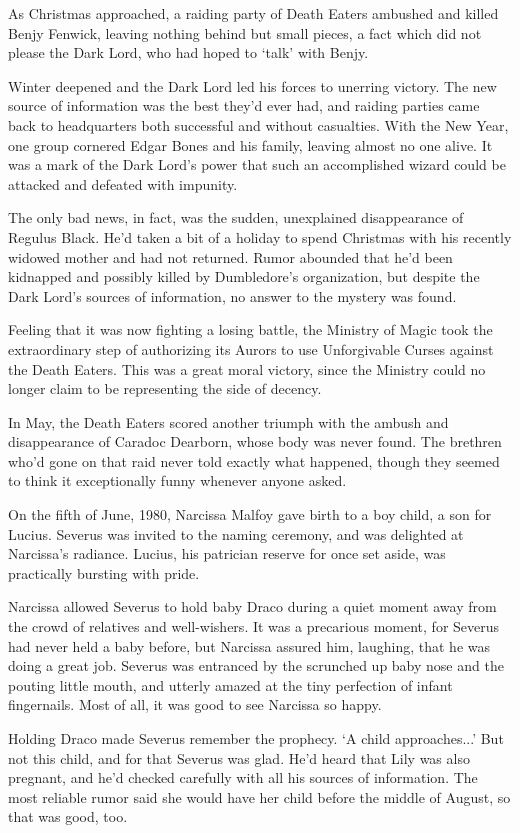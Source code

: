 As Christmas approached, a raiding party of Death Eaters ambushed and killed Benjy Fenwick, leaving nothing behind but small pieces, a fact which did not please the Dark Lord, who had hoped to `talk' with Benjy.

Winter deepened and the Dark Lord led his forces to unerring victory. The new source of information was the best they'd ever had, and raiding parties came back to headquarters both successful and without casualties. With the New Year, one group cornered Edgar Bones and his family, leaving almost no one alive. It was a mark of the Dark Lord's power that such an accomplished wizard could be attacked and defeated with impunity.

The only bad news, in fact, was the sudden, unexplained disappearance of Regulus Black. He'd taken a bit of a holiday to spend Christmas with his recently widowed mother and had not returned. Rumor abounded that he'd been kidnapped and possibly killed by Dumbledore's organization, but despite the Dark Lord's sources of information, no answer to the mystery was found.

Feeling that it was now fighting a losing battle, the Ministry of Magic took the extraordinary step of authorizing its Aurors to use Unforgivable Curses against the Death Eaters. This was a great moral victory, since the Ministry could no longer claim to be representing the side of decency.

In May, the Death Eaters scored another triumph with the ambush and disappearance of Caradoc Dearborn, whose body was never found. The brethren who'd gone on that raid never told exactly what happened, though they seemed to think it exceptionally funny whenever anyone asked.

On the fifth of June, 1980, Narcissa Malfoy gave birth to a boy child, a son for Lucius. Severus was invited to the naming ceremony, and was delighted at Narcissa's radiance. Lucius, his patrician reserve for once set aside, was practically bursting with pride.

Narcissa allowed Severus to hold baby Draco during a quiet moment away from the crowd of relatives and well-wishers. It was a precarious moment, for Severus had never held a baby before, but Narcissa assured him, laughing, that he was doing a great job. Severus was entranced by the scrunched up baby nose and the pouting little mouth, and utterly amazed at the tiny perfection of infant fingernails. Most of all, it was good to see Narcissa so happy.

Holding Draco made Severus remember the prophecy. `A child approaches...' But not this child, and for that Severus was glad. He'd heard that Lily was also pregnant, and he'd checked carefully with all his sources of information. The most reliable rumor said she would have her child before the middle of August, so that was good, too.

